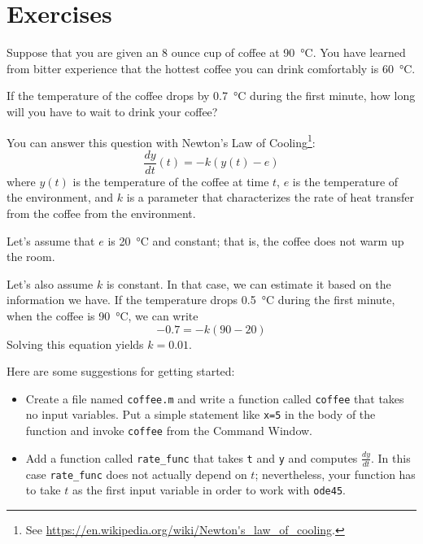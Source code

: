 \documentclass[
]{book}
\numberwithin{Answer}{chapter}
\numberwithin{Exercise}{chapter}
\begin{document}
\section{Exercises}

\begin{ex}


Suppose that you are given an 8 ounce cup of coffee at \SI{90}{\celsius}.
You have learned from bitter experience that the hottest coffee you
can drink comfortably is \SI{60}{\celsius}.  

If the temperature of the coffee drops by \SI{0.7}{\celsius} during the first minute, how long will you have to wait to drink your coffee?

You can answer this question with Newton's Law of Cooling\footnote{See \url{https://en.wikipedia.org/wiki/Newton's_law_of_cooling}.}:
%
\begin{equation*}
\frac{dy}{dt}(t) = -k (y(t) - e)
\end{equation*}
%
where $y(t)$ is the temperature of the coffee at time $t$,
$e$ is the temperature of the environment, and $k$ is a parameter
that characterizes the rate of heat transfer from the coffee from the environment.

Let's assume that $e$ is \SI{20}{\celsius} and constant; that is, the coffee does not warm up the room.

Let's also assume $k$ is constant.  In that case, we can estimate it based on the information we have.  If the temperature drops \SI{0.5}{\celsius} during the first minute, when the coffee is \SI{90}{\celsius}, we can write
%
\begin{equation*}
-0.7 = -k (90 - 20)
\end{equation*}
%
Solving this equation yields $k = 0.01$.

Here are some suggestions for getting started:

\begin{itemize}

\item Create a file named {\tt coffee.m} and write a function
called {\tt coffee} that takes no input variables.  Put a simple statement like {\tt x=5} in the body of the function and invoke {\tt coffee} from the {\sf Command Window}.

\item Add a function called {\tt rate\_func} that takes {\tt t} and {\tt y} and computes $\frac{dy}{dt}$.  In this case {\tt rate\_func} does not actually depend on $t$; nevertheless, your function has to take $t$ as
the first input variable in order to work with {\tt ode45}.


\end{itemize}
\end{ex}
\end{document}
